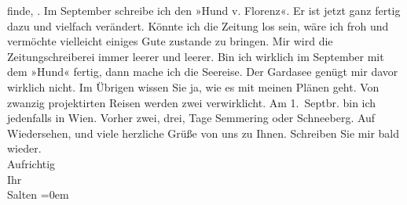 \begin{ledgroupsized}[t]{13cm}
               finde, \label{K_L03510-6v}\label{K_L03510-6h}. Im September schreibe ich den »Hund v. Florenz«. Er ist jetzt ganz fertig dazu
               und vielfach verändert. Könnte ich die Zeitung los sein, wäre ich froh und vermöchte
               vielleicht einiges Gute zustande zu bringen. Mir wird die Zeitungschreiberei immer
               leerer und leerer. Bin ich wirklich im September mit dem
                  »Hund« fertig, dann mache ich die Seereise.
               Der Gardasee genügt mir davor wirklich nicht.
               Im Übrigen wissen Sie ja, wie es mit meinen Plänen geht. Von zwanzig projektirten
               Reisen werden zwei verwirklicht. Am 1. Septbr. bin ich
               jedenfalls in Wien. Vorher zwei, drei, Tage Semmering oder Schneeberg.\pend
           \pstart
           Auf Wiedersehen, und viele herzliche Grüße von uns zu Ihnen. Schreiben Sie mir bald
               wieder. {\\[\baselineskip]}Aufrichtig {\\[\baselineskip]}Ihr {\\[\baselineskip]}\spacefill\mbox{Salten}\pend
           \leftskip=0em{}\pstart

\end{ledgroupsized}
